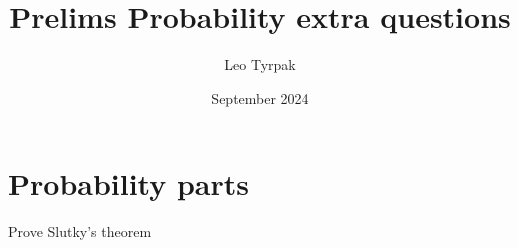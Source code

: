 \documentclass{article}
\title{Prelims Probability extra questions}
\author{Leo Tyrpak}
\date{September 2024}
\begin{document}
\maketitle
\section{Probability parts}
Prove Slutky's theorem
\end{document}
